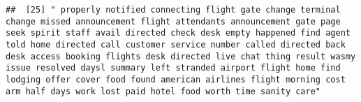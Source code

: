 \documentclass[
]{article}
\begin{document}
\begin{verbatim}
##  [25] " properly notified connecting flight gate change terminal change missed announcement flight attendants announcement gate page seek spirit staff avail directed check desk empty happened find agent told home directed call customer service number called directed back desk access booking flights desk directed live chat thing result wasmy issue resolved daysl summary left stranded airport flight home find lodging offer cover food found american airlines flight morning cost arm half days work lost paid hotel food worth time sanity care"                                                                                                                                                                                                                                                                                                                                                                                                                                                                                                                                                                                                                                                                                                                                                                                                                                                                                                                                                                                                                                                                                                                                                                                                                                       

\end{verbatim}
\end{document}
